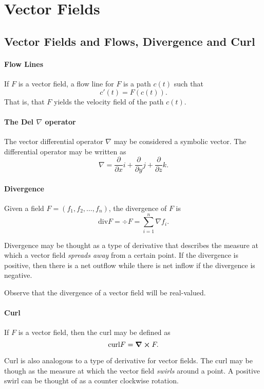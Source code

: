 \documentclass[12pt, letterpaper]{article}
\begin{document}
    
    
    \section{Vector Fields}

    \subsection{Vector Fields and Flows, Divergence and Curl}
    \paragraph{Flow Lines}
    If \(F\) is a vector field, a flow line for \(F\) is a path \(c(t)\)
    such that
    \[c'(t) = F(c(t)).\]
    That is, that \(F\) yields the velocity field of the path \(c(t)\).

    \paragraph{The Del \(\nabla\) operator}
    The vector differential operator \(\nabla\) may be considered a 
    symbolic vector.
    The differential operator may be written as 
    \[\nabla = \frac{\partial}{\partial x}i + \frac{\partial}{\partial y}j + \frac{\partial}{\partial z}k.\]

    \paragraph{Divergence}
    Given a field \(F = (f_1, f_2, \dots, f_n)\), the divergence of \(F\) is
    \[\text{div} F = \div F = \sum_{i=1}^n \nabla f_i.\]

    Divergence may be thought as a type of derivative that describes the measure at which 
    a vector field \textit{spreads away} from a certain point.
    If the divergence is positive, then there is a net outflow while there is net inflow if the divergence is negative.

    Observe that the divergence of a vector field will be real-valued.

    \paragraph{Curl}
    If \(F\) is a vector field, then the curl may be defined as
    \[\mathrm{curl}F = \curl F.\]

    Curl is also analogous to a type of derivative for vector fields. The curl may be though as the measure at which the vector field \textit{swirls} around a point.
    A positive swirl can be thought of as a counter clockwise rotation.
\end{document}
